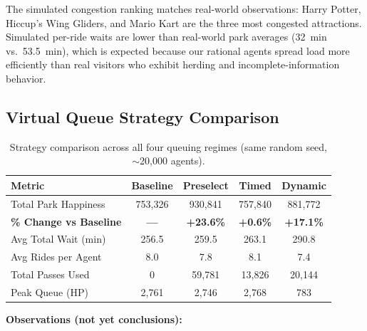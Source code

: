 \documentclass[11pt]{article}
\begin{document}
The simulated congestion ranking matches real-world observations: Harry Potter, Hiccup's Wing Gliders, and Mario Kart are the three most congested attractions. Simulated per-ride waits are lower than real-world park averages (32~min vs.\ 53.5~min), which is expected because our rational agents spread load more efficiently than real visitors who exhibit herding and incomplete-information behavior.

\subsection{Virtual Queue Strategy Comparison}

\begin{table}[H]
\centering
\small
\begin{tabular}{lcccc}
\toprule
\textbf{Metric} & \textbf{Baseline} & \textbf{Preselect} & \textbf{Timed} & \textbf{Dynamic} \\
\midrule
Total Park Happiness & 753,326 & 930,841 & 757,840 & 881,772 \\
\textbf{\% Change vs Baseline} & \textbf{---} & \textbf{+23.6\%} & \textbf{+0.6\%} & \textbf{+17.1\%} \\
Avg Total Wait (min) & 256.5 & 259.5 & 263.1 & 290.8 \\
Avg Rides per Agent & 8.0 & 7.8 & 8.1 & 7.4 \\
Total Passes Used & 0 & 59,781 & 13,826 & 20,144 \\
Peak Queue (HP) & 2,761 & 2,746 & 2,768 & 783 \\
\bottomrule
\end{tabular}
\caption{Strategy comparison across all four queuing regimes (same random seed, $\sim$20,000 agents).}
\end{table}

\textbf{Observations (not yet conclusions):}
\end{document}
